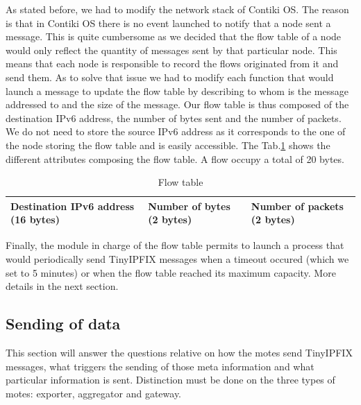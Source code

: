 As stated before, we had to modify the network stack of Contiki OS. The reason is that in Contiki OS there is no event launched to notify that a node sent a message. This is quite cumbersome as we decided that the flow table of a node would only reflect the quantity of messages sent by that particular node. This means that each node is responsible to record the flows originated from it and send them. As to solve that issue we had to modify each function that would launch a message to update the flow table by describing to whom is the message addressed to and the size of the message. Our flow table is thus composed of the destination IPv6 address, the number of bytes sent and the number of packets. We do not need to store the source IPv6 address as it corresponds to the one of the node storing the flow table and is easily accessible. The Tab.\ref{table:flow_table} shows the different attributes composing the flow table. A flow occupy a total of 20 bytes.\\

\begin{table}
  \centering
  \begin{tabular}{|p{4.5cm}|p{3cm}|p{3.5cm}|}
    \hline
    Destination IPv6 address \newline (16 bytes) & Number of bytes \newline (2 bytes) & Number of packets \newline (2 bytes)\\
    \hline
  \end{tabular}
  \caption{Flow table}
  \label{table:flow_table}
\end{table}

Finally, the module in charge of the flow table permits to launch a process that would periodically send TinyIPFIX messages when a timeout occured (which we set to 5 minutes) or when the flow table reached its maximum capacity. More details in the next section.

\subsection{Sending of data}

This section will answer the questions relative on how the motes send TinyIPFIX messages, what triggers the sending of those meta information and what particular information is sent. Distinction must be done on the three types of motes: exporter, aggregator and gateway.\\

